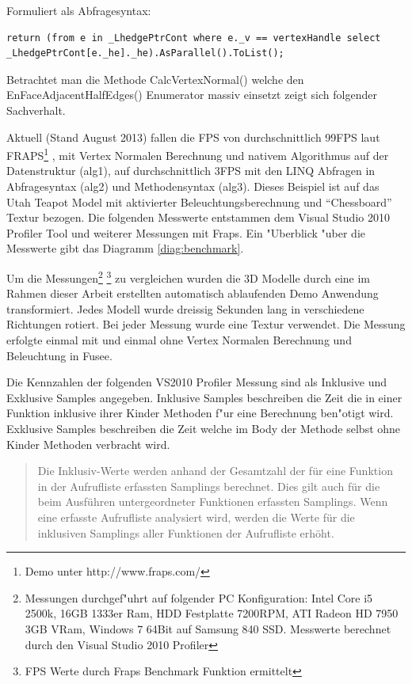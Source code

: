 \documentclass[pagesize, paper=a4, fontsize=12pt,titlepage=true, headings=small, headnosepline, abstractoff, liststotoc, nochapterprefix, plainheadsepline]{scrreprt}
\begin{document}
Formuliert als Abfragesyntax:
\begin{lstlisting}[label={code:alg2}]
return (from e in _LhedgePtrCont where e._v == vertexHandle select _LhedgePtrCont[e._he]._he).AsParallel().ToList();
\end{lstlisting}

Betrachtet man die Methode CalcVertexNormal() welche den EnFaceAdjacentHalfEdges() Enumerator massiv einsetzt zeigt sich folgender Sachverhalt.

Aktuell (Stand August 2013) fallen die FPS von durchschnittlich 99FPS laut FRAPS\footnote{ Demo unter http://www.fraps.com/} , mit Vertex Normalen Berechnung und nativem Algorithmus auf der Datenstruktur (alg1\label{code:alg1}), auf durchschnittlich 3FPS mit den LINQ Abfragen in Abfragesyntax (alg2\label{code:alg2}) und Methodensyntax (alg3\label{code:alg3}). Dieses Beispiel ist auf das Utah Teapot Model mit aktivierter Beleuchtungsberechnung und "`Chessboard"' Textur bezogen. Die folgenden Messwerte entstammen dem Visual Studio 2010 Profiler Tool und weiterer Messungen mit Fraps. Ein "Uberblick "uber die Messwerte gibt das Diagramm \ref{diag:benchmark}.
\newline

Um die Messungen\footnote{Messungen durchgef"uhrt auf folgender PC Konfiguration: Intel Core i5 2500k, 16GB 1333er Ram, HDD Festplatte 7200RPM, ATI Radeon HD 7950 3GB VRam, Windows 7 64Bit auf Samsung 840 SSD. Messwerte berechnet durch den Visual Studio 2010 Profiler\label{fn-messungenPC}} \footnote{FPS Werte durch Fraps Benchmark Funktion ermittelt} zu vergleichen wurden die 3D Modelle durch eine im Rahmen dieser Arbeit erstellten automatisch ablaufenden Demo Anwendung transformiert. Jedes Modell wurde dreissig Sekunden lang in verschiedene Richtungen rotiert. Bei jeder Messung wurde eine Textur verwendet. Die Messung erfolgte einmal mit und einmal ohne Vertex Normalen Berechnung und Beleuchtung in Fusee.
\newline

Die Kennzahlen der folgenden VS2010 Profiler Messung sind als Inklusive und Exklusive Samples angegeben. Inklusive Samples beschreiben die Zeit die in einer Funktion inklusive ihrer Kinder Methoden f"ur eine Berechnung ben"otigt wird. Exklusive Samples beschreiben die Zeit welche im Body der Methode selbst ohne Kinder Methoden verbracht wird.

\begin{quote}Die Inklusiv-Werte werden anhand der Gesamtzahl der f{\"u}r eine Funktion in der Aufrufliste erfassten Samplings berechnet. Dies gilt auch f{\"u}r die beim Ausf{\"u}hren untergeordneter Funktionen erfassten Samplings. Wenn eine erfasste Aufrufliste analysiert wird, werden die Werte f{\"u}r die inklusiven Samplings aller Funktionen der Aufrufliste erh{\"o}ht. \cite[Analyse von Leistungsdaten]{MicrosoftCReferenz.2013}\end{quote}
\end{document}
